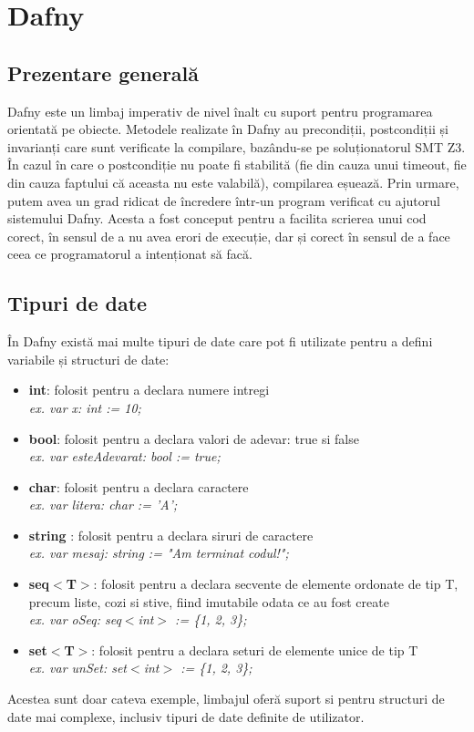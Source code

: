 \chapter{Dafny}
\section{Prezentare generală}

Dafny este un limbaj imperativ de nivel înalt cu suport pentru programarea orientată pe obiecte. Metodele realizate în Dafny
au precondiții, postcondiții și invarianți care sunt verificate la compilare, bazându-se pe soluționatorul SMT Z3. În cazul în care o postcondiție nu poate fi stabilită (fie din cauza unui timeout, fie din cauza faptului că aceasta nu este valabilă), compilarea eșuează. Prin urmare, putem avea un grad ridicat de încredere într-un program verificat cu ajutorul sistemului Dafny.
Acesta a fost conceput pentru a facilita scrierea unui cod corect, în sensul de a nu avea erori de execuție, dar și corect în sensul de a face ceea ce programatorul a intenționat să facă.

\section{Tipuri de date}
În Dafny există mai multe tipuri de date care pot fi utilizate pentru a defini variabile și structuri de date:

\begin{itemize}
  \item \textbf {int}: folosit pentru a declara numere intregi\\ 
  \textit{ex. var x: int := 10;}
  \item \textbf {bool}: folosit pentru a declara valori de adevar: true si false\\
  \textit{ex. var esteAdevarat: bool := true;}
  \item \textbf {char}: folosit pentru a declara caractere \\
  \textit{ex. var litera: char := 'A';}
  \item \textbf {string} : folosit pentru a declara siruri de caractere\\
  \textit{ex. var mesaj: string := "Am terminat codul!";}
  \item \textbf {seq$<$T$>$}: folosit pentru a declara secvente de elemente ordonate de tip T, precum liste, cozi si stive, fiind imutabile odata ce au fost create \\
  \textit{ex. var oSeq: seq$<$int$>$ := \{1, 2, 3\};}
  \item \textbf {set$<$T$>$}: folosit pentru a declara seturi de elemente unice de tip T \\
  \textit{ex. var unSet: set$<$int$>$ := \{1, 2, 3\};}
  
\end{itemize}
Acestea sunt doar cateva exemple, limbajul oferă suport si pentru structuri de date mai complexe, inclusiv tipuri de date definite de utilizator. 
  

